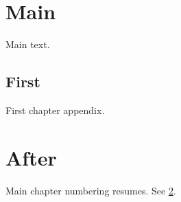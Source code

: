 \documentclass{book}
\begin{document}
\chapter{Main}Main text.
\begin{appendices}
\chapter{First}\label{app:first}First chapter appendix.
\end{appendices}
\chapter{After}Main chapter numbering resumes. See \ref{app:first}.
\end{document}
